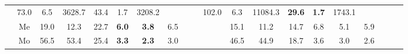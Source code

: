 \documentclass[french,10pt]{article}
\begin{document}
\begin{landscape}
\begin{longtable}{ l  c | c c c | c c c | c c c | c c c | c c c | c c c | }
                    &                     73.0
     & {\footnotesize     6.5
    } & {\footnotesize     3628.7
     }
    
    
                    &                     43.4
     & {\footnotesize     1.7
    } & {\footnotesize     3208.2
     }
    
    
                    & & &

                    &                     102.0
     & {\footnotesize     6.3
    } & {\footnotesize     11084.3
     }
    
    
                    &                     \textbf{ 29.6}
     & {\footnotesize     \textbf{ 1.7}
    } & {\footnotesize     1743.1
     }
    
    
                    & & &

                    \\*
                        & {\small Me  }

                    &                     19.0
     & {\footnotesize     12.3
    } & {\footnotesize     22.7
     }
    
    
                    &                     \textbf{ 6.0}
     & {\footnotesize     \textbf{ 3.8}
    } & {\footnotesize     6.5
     }
    
    
                    & & &

                    &                     15.1
     & {\footnotesize     11.2
    } & {\footnotesize     14.7
     }
    
    
                    &                     6.8
     & {\footnotesize     5.1
    } & {\footnotesize     5.9
     }
    
    
                    & & &

                    \\*
                        & {\small Mo  }

                    &                     56.5
     & {\footnotesize     53.4
    } & {\footnotesize     25.4
     }
    
    
                    &                     \textbf{ 3.3}
     & {\footnotesize     \textbf{ 2.3}
    } & {\footnotesize     3.0
     }
    
    
                    & & &

                    &                     46.5
     & {\footnotesize     44.9
    } & {\footnotesize     18.7
     }
    
    
                    &                     3.6
     & {\footnotesize     3.0
    } & {\footnotesize     2.6
     }
    

\end{longtable}
\end{landscape}
\end{document}
